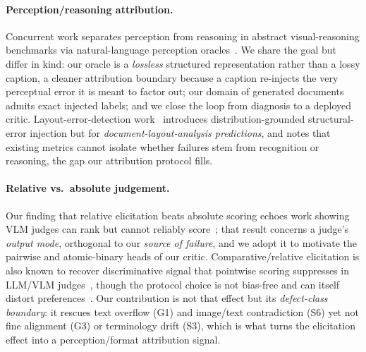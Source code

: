 \documentclass[10pt]{article}
\newcommand{\g}[1]{\textsf{#1}}        %
\begin{document}
\paragraph{Perception/reasoning attribution.}
Concurrent work separates perception from reasoning in abstract visual-reasoning benchmarks via
natural-language perception oracles~\cite{reasoningbench}. We share the goal but differ in kind: our oracle is a
\emph{lossless} structured representation rather than a lossy caption, a cleaner attribution boundary because a
caption re-injects the very perceptual error it is meant to factor out; our domain of generated documents
admits exact injected labels; and we close the loop from diagnosis to a deployed critic.
Layout-error-detection work~\cite{led} introduces distribution-grounded structural-error injection but for
\emph{document-layout-analysis predictions}, and notes that existing metrics cannot isolate whether
failures stem from recognition or reasoning, the gap our attribution protocol fills.

\paragraph{Relative vs.\ absolute judgement.}
Our finding that relative elicitation beats absolute scoring echoes work showing VLM judges can rank but
cannot reliably score~\cite{rankscore}; that result concerns a judge's \emph{output mode}, orthogonal to our
\emph{source of failure}, and we adopt it to motivate the pairwise and atomic-binary heads of our critic.
Comparative/relative elicitation is also known to recover discriminative signal that pointwise scoring
suppresses in LLM/VLM judges~\cite{comparative}, though the protocol choice is not bias-free and can itself
distort preferences~\cite{pairpoint}. Our contribution is not that effect but its \emph{defect-class boundary}: it
rescues text overflow (\g{G1}) and image/text contradiction (\g{S6}) yet not fine alignment (\g{G3}) or
terminology drift (\g{S3}), which is what turns the elicitation effect into a perception/format attribution
signal.
\end{document}

